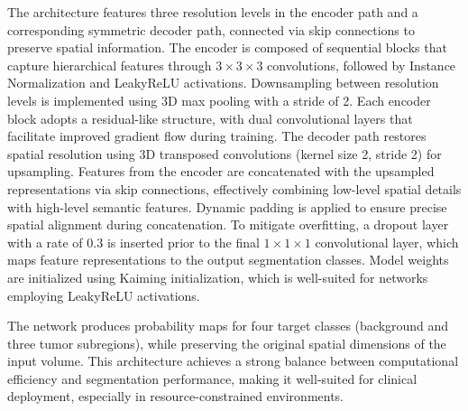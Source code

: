 \documentclass[10pt,twocolumn,letterpaper]{article}
\begin{document}
The architecture features three resolution levels in the encoder path and a corresponding symmetric decoder path, connected via skip connections to preserve spatial information. The encoder is composed of sequential blocks that capture hierarchical features through $3\times3\times3$ convolutions, followed by Instance Normalization and LeakyReLU activations. Downsampling between resolution levels is implemented using 3D max pooling with a stride of 2.
Each encoder block adopts a residual-like structure, with dual convolutional layers that facilitate improved gradient flow during training. The decoder path restores spatial resolution using 3D transposed convolutions (kernel size 2, stride 2) for upsampling. Features from the encoder are concatenated with the upsampled representations via skip connections, effectively combining low-level spatial details with high-level semantic features. Dynamic padding is applied to ensure precise spatial alignment during concatenation.
To mitigate overfitting, a dropout layer with a rate of $0.3$ is inserted prior to the final $1\times1\times1$ convolutional layer, which maps feature representations to the output segmentation classes. Model weights are initialized using Kaiming initialization, which is well-suited for networks employing LeakyReLU activations.

The network produces probability maps for four target classes (background and three tumor subregions), while preserving the original spatial dimensions of the input volume. This architecture achieves a strong balance between computational efficiency and segmentation performance, making it well-suited for clinical deployment, especially in resource-constrained environments.
\end{document}
